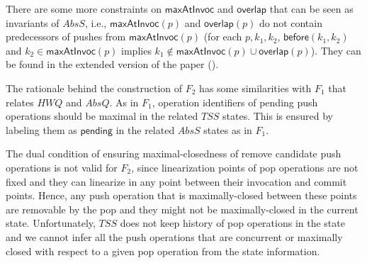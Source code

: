 \begin{itemize}
%	
\vspace{-2mm}
\end{itemize}
There are some more constraints on $\mathsf{maxAtInvoc}$ and $\mathsf{overlap}$ that can be seen as invariants of $AbsS$, i.e., $\mathsf{maxAtInvoc}(p)$ and $\mathsf{overlap}(p)$ do not contain predecessors of pushes from $\mathsf{maxAtInvoc}(p)$ (for each $p, k_1, k_2$, $\mathsf{before}(k_1, k_2)$ and $k_2 \in \mathsf{maxAtInvoc}(p)$ implies $k_1\not\in \mathsf{maxAtInvoc}(p)\cup \mathsf{overlap}(p)$). They can be found in the extended version of the paper (\cite{extended}).

The rationale behind the construction of $F_2$ has some similarities with $F_1$ that relates $\mathit{HWQ}$ and $AbsQ$. As in $F_1$, operation identifiers of pending push operations should be maximal in the related $\mathit{TSS}$ states. This is ensured by labeling them as $\mathsf{pending}$ in the related $AbsS$ states as in $F_1$. 

The dual condition of ensuring maximal-closedness of remove candidate push operations is not valid for $F_2$, since linearization points of pop operations are not fixed and they can linearize in any point between their invocation and commit points. Hence, any push operation that is maximally-closed between these points are removable by the pop and they might not be maximally-closed in the current state. Unfortunately, $\mathit{TSS}$ does not keep history of pop operations in the state and we cannot infer all the push operations that are concurrent or maximally closed with respect to a given pop operation from the state information.


